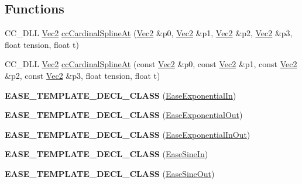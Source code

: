 \subsection*{Functions}
\begin{DoxyCompactItemize}
\item 
C\+C\+\_\+\+D\+LL \hyperlink{classVec2}{Vec2} \hyperlink{group__actions_gac368291f4754e4c1b34fec023a30dd23}{cc\+Cardinal\+Spline\+At} (\hyperlink{classVec2}{Vec2} \&p0, \hyperlink{classVec2}{Vec2} \&p1, \hyperlink{classVec2}{Vec2} \&p2, \hyperlink{classVec2}{Vec2} \&p3, float tension, float t)
\item 
C\+C\+\_\+\+D\+LL \hyperlink{classVec2}{Vec2} \hyperlink{group__actions_ga24dfaba12398099e778c699dd10e7114}{cc\+Cardinal\+Spline\+At} (const \hyperlink{classVec2}{Vec2} \&p0, const \hyperlink{classVec2}{Vec2} \&p1, const \hyperlink{classVec2}{Vec2} \&p2, const \hyperlink{classVec2}{Vec2} \&p3, float tension, float t)
\item 
\mbox{\label{group__actions_gae0bdce865ab6fc0e56cbd2c683595c81}} 
{\bfseries E\+A\+S\+E\+\_\+\+T\+E\+M\+P\+L\+A\+T\+E\+\_\+\+D\+E\+C\+L\+\_\+\+C\+L\+A\+SS} (\hyperlink{classEaseExponentialIn}{Ease\+Exponential\+In})
\item 
\mbox{\label{group__actions_gaa34545d23ec4b416742068c1c86f7e5f}} 
{\bfseries E\+A\+S\+E\+\_\+\+T\+E\+M\+P\+L\+A\+T\+E\+\_\+\+D\+E\+C\+L\+\_\+\+C\+L\+A\+SS} (\hyperlink{classEaseExponentialOut}{Ease\+Exponential\+Out})
\item 
\mbox{\label{group__actions_gab0887091df540d70b47982119a6820b0}} 
{\bfseries E\+A\+S\+E\+\_\+\+T\+E\+M\+P\+L\+A\+T\+E\+\_\+\+D\+E\+C\+L\+\_\+\+C\+L\+A\+SS} (\hyperlink{classEaseExponentialInOut}{Ease\+Exponential\+In\+Out})
\item 
\mbox{\label{group__actions_ga9c278223efdf59b86cb76bd813956826}} 
{\bfseries E\+A\+S\+E\+\_\+\+T\+E\+M\+P\+L\+A\+T\+E\+\_\+\+D\+E\+C\+L\+\_\+\+C\+L\+A\+SS} (\hyperlink{classEaseSineIn}{Ease\+Sine\+In})
\item 
\mbox{\label{group__actions_gafe69c7a9c7652cdf2d6b9c35192eb059}} 
{\bfseries E\+A\+S\+E\+\_\+\+T\+E\+M\+P\+L\+A\+T\+E\+\_\+\+D\+E\+C\+L\+\_\+\+C\+L\+A\+SS} (\hyperlink{classEaseSineOut}{Ease\+Sine\+Out})
\item 

\end{DoxyCompactItemize}
